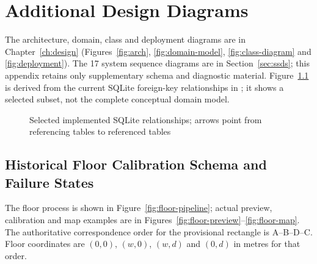\chapter{Additional Design Diagrams}
The architecture, domain, class and deployment diagrams are in Chapter~\ref{ch:design} (Figures~\ref{fig:arch}, \ref{fig:domain-model}, \ref{fig:class-diagram} and \ref{fig:deployment}). The 17 system sequence diagrams are in Section~\ref{sec:ssds}; this appendix retains only supplementary schema and diagnostic material. Figure~\ref{fig:implemented-schema} is derived from the current SQLite foreign-key relationships in ; it shows a selected subset, not the complete conceptual domain model.
\begin{figure}[H]
\centering
{}
\caption{Selected implemented SQLite relationships; arrows point from referencing tables to referenced tables}
\label{fig:implemented-schema}
\end{figure}

\section{Historical Floor Calibration Schema and Failure States}
The floor process is shown in Figure~\ref{fig:floor-pipeline}; actual preview, calibration and map examples are in Figures~\ref{fig:floor-preview}--\ref{fig:floor-map}. The authoritative correspondence order for the provisional rectangle is A--B--D--C. Floor coordinates are $(0,0)$, $(w,0)$, $(w,d)$ and $(0,d)$ in metres for that order.

